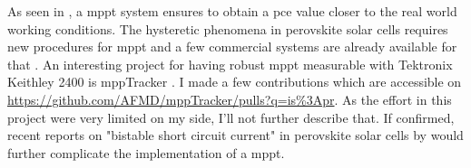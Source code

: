 	As seen in , a \gls{mppt} system ensures to obtain a \gls{pce} value closer to the real world working conditions.
	The hysteretic phenomena in perovskite solar cells requires new procedures for \gls{mppt} \cite{Cimaroli2017,Pellet2017} and a few commercial systems are already available for that \cite{CicciResearchsrl2019,CandlelightSystems}.
	An interesting project for having robust \gls{mppt} measurable with Tektronix Keithley 2400 is mppTracker \cite{AFMD2017}.
	I made a few contributions which are accessible on \url{https://github.com/AFMD/mppTracker/pulls?q=is%3Apr}.
	As the effort in this project were very limited on my side, I'll not further describe that.
	If confirmed, recent reports on "bistable short circuit current" in perovskite solar cells by  would further complicate the implementation of a \gls{mppt}.
